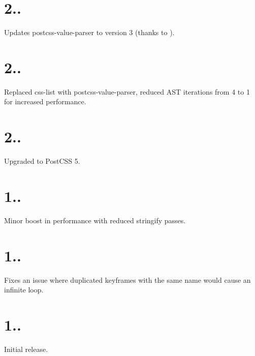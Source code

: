 \section*{2..}


\begin{DoxyItemize}
\item Updates postcss-\/value-\/parser to version 3 (thanks to ).
\end{DoxyItemize}

\section*{2..}


\begin{DoxyItemize}
\item Replaced css-\/list with postcss-\/value-\/parser, reduced A\+ST iterations from 4 to 1 for increased performance.
\end{DoxyItemize}

\section*{2..}


\begin{DoxyItemize}
\item Upgraded to Post\+C\+SS 5.
\end{DoxyItemize}

\section*{1..}


\begin{DoxyItemize}
\item Minor boost in performance with reduced stringify passes.
\end{DoxyItemize}

\section*{1..}


\begin{DoxyItemize}
\item Fixes an issue where duplicated keyframes with the same name would cause an infinite loop.
\end{DoxyItemize}

\section*{1..}


\begin{DoxyItemize}
\item Initial release. 
\end{DoxyItemize}